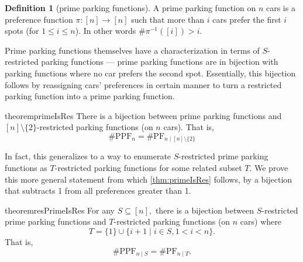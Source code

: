 \documentclass[12 pt]{amsart}
\theoremstyle{definition} %
\newtheorem{definition}[theorem]{Definition}
\theoremstyle{remark} %
\begin{document}
\begin{definition}[prime parking functions]
	A prime parking function on $n$ cars is a preference function $\pi : [n] \to [n]$ such that more than $i$ cars prefer the first $i$ spots (for $1 \le i \le n$). In other words $\# \pi^{-1}([i]) > i$.
\end{definition}

Prime parking functions themselves have a characterization in terms of $S$-restricted parking functions --- prime parking functions are in bijection with parking functions where no car prefers the second spot. Essentially, this bijection follows by reassigning cars' preferences in certain manner to turn a restricted parking function into a prime parking function.

\begin{restatable}{theorem}{primeIsRes}
    \label{thm:primeIsRes}
	There is a bijection between prime parking functions and $[n] \setminus \{ 2 \}$-restricted parking functions (on $n$ cars). That is,
	\[
		\# \mathrm{PPF}_{n} = \# \mathrm{PF}_{n \mid [n] \setminus \{ 2 \}} 
	\]
\end{restatable}

In fact, this generalizes to a way to enumerate $S$-restricted prime parking functions as $T$-restricted parking functions for some related subset $T$. We prove this more general statement from which \cref{thm:primeIsRes} follows, by a bijection that subtracts 1 from all preferences greater than 1. 

\begin{restatable}{theorem}{resPrimeIsRes}
	For any $S\subseteq [n],$  there is a bijection between $S$-restricted prime parking functions and $T$-restricted parking functions (on $n$ cars) where
	\[
		T = \{ 1 \} \cup \{ i + 1 \mid i \in S, 1 < i < n \}.
	\]
	That is,
	\[
		\# \mathrm{PPF}_{n \mid S} = \# \mathrm{PF}_{n \mid T}.
	\]
\end{restatable}
\end{document}
